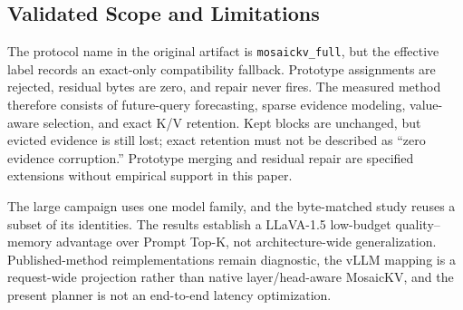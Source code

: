 \subsection{Validated Scope and Limitations}
\label{sec:eval-limitations}

The protocol name in the original artifact is \texttt{mosaickv\_full}, but
the effective label records an exact-only compatibility fallback.  Prototype
assignments are rejected, residual bytes are zero, and repair never fires.
The measured method therefore consists of future-query forecasting, sparse
evidence modeling, value-aware selection, and exact K/V retention.  Kept
blocks are unchanged, but evicted evidence is still lost; exact retention
must not be described as ``zero evidence corruption.''  Prototype merging
and residual repair are specified extensions without empirical support in
this paper.

The large campaign uses one model family, and the byte-matched study reuses a
subset of its identities.  The results establish a LLaVA-1.5 low-budget
quality--memory advantage over Prompt Top-K, not architecture-wide
generalization.  Published-method reimplementations remain diagnostic, the
vLLM mapping is a request-wide projection rather than native layer/head-aware
MosaicKV, and the present planner is not an end-to-end latency optimization.
